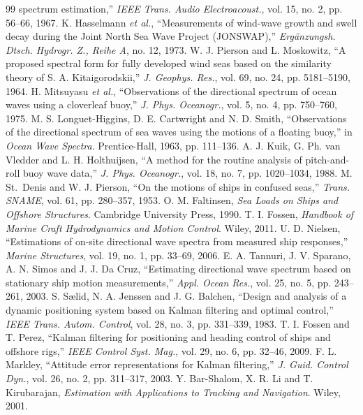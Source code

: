 \documentclass[conference]{IEEEtran}
\theoremstyle{bodysmall}
\begin{document}
\begin{thebibliography}{99}
spectrum estimation,'' \emph{IEEE Trans. Audio Electroacoust.}, vol. 15,
no. 2, pp. 56--66, 1967.
K. Hasselmann \emph{et al.}, ``Measurements of wind-wave growth and swell
decay during the Joint North Sea Wave Project (JONSWAP),''
\emph{Erg\"anzungsh. Dtsch. Hydrogr. Z., Reihe A}, no. 12, 1973.
W. J. Pierson and L. Moskowitz, ``A proposed spectral form for fully
developed wind seas based on the similarity theory of S. A.
Kitaigorodskii,'' \emph{J. Geophys. Res.}, vol. 69, no. 24,
pp. 5181--5190, 1964.
H. Mitsuyasu \emph{et al.}, ``Observations of the directional spectrum of
ocean waves using a cloverleaf buoy,'' \emph{J. Phys. Oceanogr.}, vol. 5,
no. 4, pp. 750--760, 1975.
M. S. Longuet-Higgins, D. E. Cartwright and N. D. Smith, ``Observations of the
directional spectrum of sea waves using the motions of a floating buoy,'' in
\emph{Ocean Wave Spectra}. Prentice-Hall, 1963, pp. 111--136.
A. J. Kuik, G. Ph. van Vledder and L. H. Holthuijsen, ``A method for the
routine analysis of pitch-and-roll buoy wave data,'' \emph{J. Phys.
Oceanogr.}, vol. 18, no. 7, pp. 1020--1034, 1988.
M. St.~Denis and W. J. Pierson, ``On the motions of ships in confused
seas,'' \emph{Trans. SNAME}, vol. 61, pp. 280--357, 1953.
O. M. Faltinsen, \emph{Sea Loads on Ships and Offshore Structures}.
Cambridge University Press, 1990.
T. I. Fossen, \emph{Handbook of Marine Craft Hydrodynamics and Motion
Control}. Wiley, 2011.
U. D. Nielsen, ``Estimations of on-site directional wave spectra from
measured ship responses,'' \emph{Marine Structures}, vol. 19, no. 1,
pp. 33--69, 2006.
E. A. Tannuri, J. V. Sparano, A. N. Simos and J. J. Da Cruz, ``Estimating
directional wave spectrum based on stationary ship motion measurements,''
\emph{Appl. Ocean Res.}, vol. 25, no. 5, pp. 243--261, 2003.
S. S\ae lid, N. A. Jenssen and J. G. Balchen, ``Design and analysis of a
dynamic positioning system based on Kalman filtering and optimal control,''
\emph{IEEE Trans. Autom. Control}, vol. 28, no. 3, pp. 331--339, 1983.
T. I. Fossen and T. Perez, ``Kalman filtering for positioning and heading
control of ships and offshore rigs,'' \emph{IEEE Control Syst. Mag.},
vol. 29, no. 6, pp. 32--46, 2009.
F. L. Markley, ``Attitude error representations for Kalman filtering,''
\emph{J. Guid. Control Dyn.}, vol. 26, no. 2, pp. 311--317, 2003.
Y. Bar-Shalom, X. R. Li and T. Kirubarajan, \emph{Estimation with
Applications to Tracking and Navigation}. Wiley, 2001.
\end{thebibliography}
\end{document}
